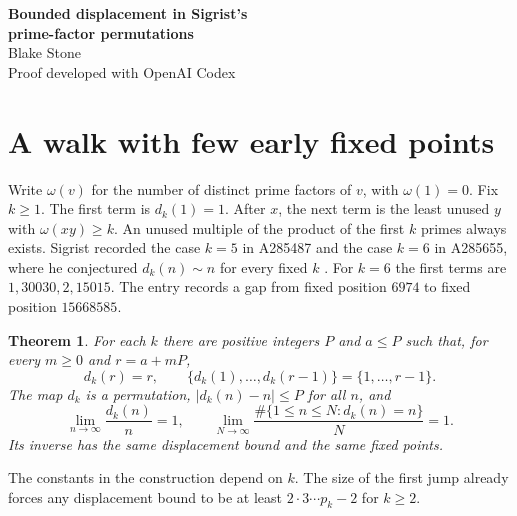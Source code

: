 \documentclass[11pt]{article}
\newtheorem{theorem}{Theorem}[section]
\newcommand{\card}{\#}
\begin{document}
\begin{center}
{\LARGE\bfseries Bounded displacement in Sigrist's\\[2pt] prime-factor permutations}\\[7pt]
Blake Stone\\[-1pt]{\small Proof developed with OpenAI Codex}
\end{center}
\begin{abstract}
Starting at $1$, take the least unused positive integer whose product with the previous term has at least $k$ distinct prime factors. For every fixed $k$, we prove that this permutation has bounded displacement and fixes a set of natural density one. This settles Sigrist's conjecture that $d_k(n)\sim n$. The proof finds an arithmetic progression of positions at which the walk has used exactly the initial interval. For $k=3$, eventual equality with the identity is equivalent to finiteness of the combined set of Mersenne and Fermat primes. For $k\ge5$ there are infinitely many moved positions.
\end{abstract}

\section{A walk with few early fixed points}
Write $\omega(v)$ for the number of distinct prime factors of $v$, with $\omega(1)=0$. Fix $k\ge1$. The first term is $d_k(1)=1$. After $x$, the next term is the least unused $y$ with $\omega(xy)\ge k$. An unused multiple of the product of the first $k$ primes always exists. Sigrist recorded the case $k=5$ in A285487 and the case $k=6$ in A285655, where he conjectured $d_k(n)\sim n$ for every fixed $k$ \cite{sigrist}. For $k=6$ the first terms are $1,30030,2,15015$. The entry records a gap from fixed position $6974$ to fixed position $15668585$.
\begin{theorem}\label{main}
For each $k$ there are positive integers $P$ and $a\le P$ such that, for every $m\ge0$ and $r=a+mP$,
\[
 d_k(r)=r,\qquad \{d_k(1),\ldots,d_k(r-1)\}=\{1,\ldots,r-1\}.
\]
The map $d_k$ is a permutation, $|d_k(n)-n|\le P$ for all $n$, and
\[
 \lim_{n\to\infty}\frac{d_k(n)}n=1,\qquad
 \lim_{N\to\infty}\frac{\card\{1\le n\le N:d_k(n)=n\}}{N}=1.
\]
Its inverse has the same displacement bound and the same fixed points.
\end{theorem}
The constants in the construction depend on $k$. The size of the first jump already forces any displacement bound to be at least $2\cdot3\cdots p_k-2$ for $k\ge2$.
\end{document}
